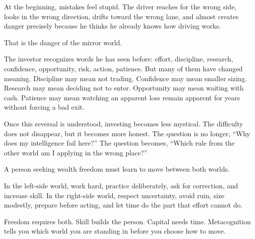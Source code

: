 At the beginning, mistakes feel stupid. The driver reaches for the wrong side, looks in the wrong direction, drifts toward the wrong lane, and almost creates danger precisely because he thinks he already knows how driving works.

That is the danger of the mirror world.

The investor recognizes words he has seen before: effort, discipline, research, confidence, opportunity, risk, action, patience. But many of them have changed meaning. Discipline may mean not trading. Confidence may mean smaller sizing. Research may mean deciding not to enter. Opportunity may mean waiting with cash. Patience may mean watching an apparent loss remain apparent for years without forcing a bad exit.

Once this reversal is understood, investing becomes less mystical. The difficulty does not disappear, but it becomes more honest. The question is no longer, ``Why does my intelligence fail here?'' The question becomes, ``Which rule from the other world am I applying in the wrong place?''

A person seeking wealth freedom must learn to move between both worlds.

In the left-side world, work hard, practice deliberately, ask for correction, and increase skill. In the right-side world, respect uncertainty, avoid ruin, size modestly, prepare before acting, and let time do the part that effort cannot do.

Freedom requires both. Skill builds the person. Capital needs time. Metacognition tells you which world you are standing in before you choose how to move.
